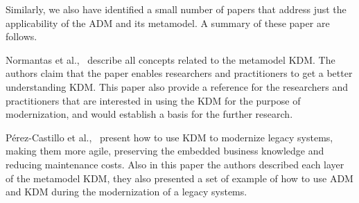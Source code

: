 Similarly, we also have identified a small number of papers that address just the applicability of the ADM and its metamodel. A summary of these paper are follows.

Normantas et al.,~\cite{Normantas:2012:OKD:2383276.2383286} describe all concepts related to the metamodel KDM. The authors claim that the paper enables researchers and practitioners to get a better understanding KDM. This paper also provide a reference for the researchers and practitioners that are interested in using the KDM for the purpose of modernization, and would establish a basis for the further research. 

P\'{e}rez-Castillo et al.,~\cite{PrezCastillo2011519} present how to use KDM to modernize legacy systems, making them more agile, preserving the embedded business knowledge and reducing maintenance costs. Also in this paper the authors described each layer of the metamodel KDM, they also presented a set of example of how to use ADM and KDM during the modernization of a legacy systems.









